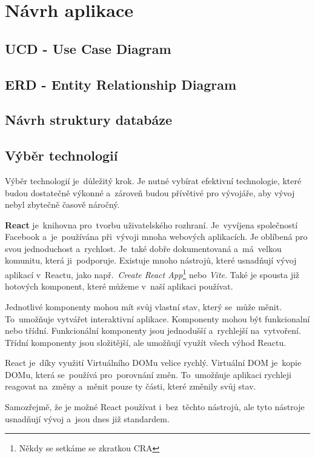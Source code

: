 \documentclass[14pt,a4paper]{article}
\begin{document}
	\section{Návrh aplikace}
        \subsection{UCD - Use Case Diagram}
        \subsection{ERD - Entity Relationship Diagram}
        \subsection{Návrh struktury databáze}
        \subsection{Výběr technologií}
            Výběr technologií je~důležitý krok. Je nutné vybírat efektivní technologie, které budou dostatečně výkonné a~zároveň budou
            přívětivé pro vývojáře, aby vývoj nebyl zbytečně časově náročný.

            \textbf{React} je~knihovna pro~tvorbu uživatelského rozhraní. Je~vyvíjena společností Facebook a~je~používána při~vývoji mnoha webových aplikacích.
            Je oblíbená pro svou jednoduchost a~rychlost. Je~také dobře dokumentovaná a~má~velkou komunitu, která ji~podporuje.
            Existuje mnoho nástrojů, které usnadňují vývoj aplikací v~Reactu, jako
            např.~\emph{Create React App}\footnote{Někdy se setkáme se zkratkou CRA} nebo \emph{Vite}.
            Také je spousta již hotových komponent, které můžeme v~naší aplikaci používat.

            Jednotlivé komponenty mohou mít svůj vlastní stav, který se~může měnit. To~umožňuje vytvářet interaktivní aplikace.
            Komponenty mohou být funkcionalní nebo třídní. Funkcionální komponenty jsou jednodušší a~rychlejší na~vytvoření.
            Třídní komponenty jsou složitější, ale umožňují využít všech výhod Reactu.

            React je~díky využití Virtuálního DOMu velice rychlý. Virtuální DOM je~kopie DOMu, která se~používá pro~porovnání změn.
            To~umožňuje aplikaci rychleji reagovat na~změny a~měnit pouze ty části, které změnily svůj stav.

            Samozřejmě, že je možné React používat i~bez~těchto nástrojů, ale tyto nástroje usnadňují vývoj a~jsou dnes již standardem.
\end{document}
